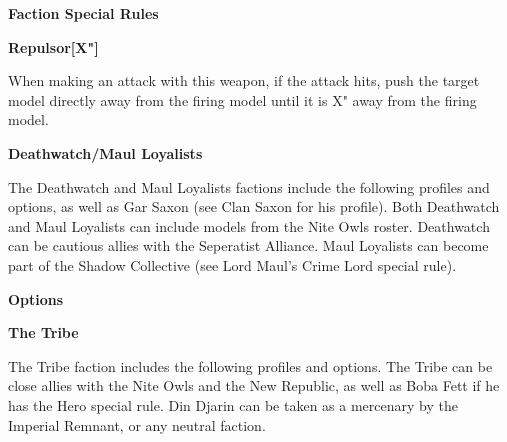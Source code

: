 \documentclass{article}
\begin{document}
{\large \textbf{Faction Special Rules}}
\vspace{0.3cm}
\begin{multicols}{2}
    {\scriptsize

    \begin{minipage}{9cm}
        {\normalsize \textbf{Repulsor[X"]}}
        \vspace{0.3cm}

        When making an attack with this weapon, if the attack hits,
        push the target model directly away from the firing model
        until it is X" away from the firing model.
    \end{minipage}

    }
\end{multicols}

\newpage

{\Large \textbf{Deathwatch/Maul Loyalists}}
\vspace{0.3cm}

\begin{minipage}{19cm}
    The Deathwatch and Maul Loyalists factions include the following profiles and
    options, as well as Gar Saxon (see Clan Saxon for his profile).
    Both Deathwatch and Maul Loyalists can include models from the Nite Owls roster.
    Deathwatch can be cautious allies with the Seperatist Alliance.
    Maul Loyalists can become part of the Shadow Collective (see Lord Maul's 
    Crime Lord special rule).
\end{minipage}

\vspace{0.3cm}
{\scriptsize
\setlength\extrarowheight{1.5pt}

}
\vspace{0.6cm}

{\large \textbf{Options}}
\vspace{0.3cm}
\begin{multicols}{2}
    {\scriptsize

    \setlength\extrarowheight{1.5pt}
    

    }
\end{multicols}
\vspace{0.6cm}

{\Large \textbf{The Tribe}}
\vspace{0.3cm}

\begin{minipage}{19cm}
    The Tribe faction includes the following profiles and options.
    The Tribe can be close allies with the Nite Owls and the New Republic, as well as
    Boba Fett if he has the Hero special rule.
    Din Djarin can be taken as a mercenary by the Imperial Remnant,
    or any neutral faction.
\end{minipage}
\end{document}
